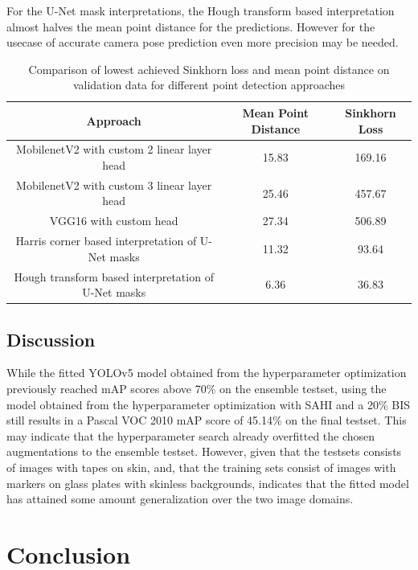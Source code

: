 \documentclass[10pt]{book}
\begin{document}
For the U-Net mask interpretations, the Hough transform based interpretation almost halves the mean point distance for the predictions. However for the usecase of accurate camera pose prediction even more precision may be needed.

\begin{table}
  \begin{tabular}{ c c c }
   Approach & Mean Point Distance & Sinkhorn Loss \\ 
   \hline
   MobilenetV2 with custom 2 linear layer head & 15.83 & 169.16 \\
   MobilenetV2 with custom 3 linear layer head & 25.46 & 457.67 \\
   VGG16 with custom head & 27.34 & 506.89 \\
   Harris corner based interpretation of U-Net masks & 11.32 & 93.64 \\
   Hough transform based interpretation of U-Net masks & 6.36 & 36.83 \\
   \hline
  \end{tabular}
  \caption{\label{tab:pet_valdata_results}Comparison of lowest achieved Sinkhorn loss and mean point distance on validation data for different point detection approaches}
\end{table}

\section{Discussion}

While the fitted \ac{YOLO}v5 model obtained from the hyperparameter optimization previously reached \ac{mAP} scores above 70\% on the ensemble testset, using the model obtained from the hyperparameter optimization with \ac{SAHI} and a 20\% \ac{BIS} still results in a Pascal VOC 2010 \ac{mAP} score of 45.14\% on the final testset. This may indicate that the hyperparameter search already overfitted the chosen augmentations to the ensemble testset. However, given that the testsets consists of images with tapes on skin, and, that the training sets consist of images with markers on glass plates with skinless backgrounds, indicates that the fitted model has attained some amount generalization over the two image domains.


\chapter{Conclusion}
\label{chap:conclusion}
\end{document}
